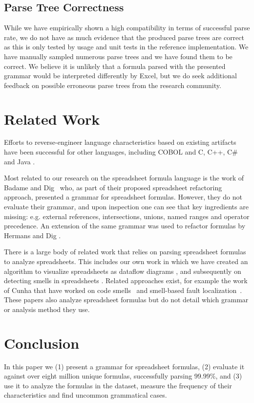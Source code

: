 \documentclass[times]{smrauth}
\begin{document}
\subsection{Parse Tree Correctness}

While we have empirically shown a high compatibility in terms of successful parse rate, we do not have as much evidence that the produced parse trees are correct as this is only tested by usage and unit tests in the reference implementation. We have manually sampled numerous parse trees and we have found them to be correct. We believe it is unlikely that a formula parsed with the presented grammar would be interpreted differently by Excel, but we do seek additional feedback on possible erroneous parse trees from the research community.

\section{Related Work}
\label{section:relatedWork}
Efforts to reverse-engineer language characteristics based on existing artifacts have been successful for other languages, including COBOL \cite{van1997obtaining} and C, C++, C\# and Java \cite{zaytsev2010recovery}.

Most related to our research on the spreadsheet formula language is the work of Badame and Dig~\cite{badame2012refactoring} who, as part of their proposed spreadsheet refactoring approach, presented a grammar for spreadsheet formulas. However, they do not evaluate their grammar, and upon inspection one can see that key ingredients are missing: e.g. external references, intersections, unions, named ranges and operator precedence. An extension of the same grammar was used to refactor formulas by Hermans and Dig \cite{hermans2014bumblebee}.

There is a large body of related work that relies on parsing spreadsheet formulas to analyze spreadsheets. This includes our own work in which we have created an algorithm to visualize spreadsheets as dataflow diagrams \cite{DBLP:conf/icse/HermansPD11}, and subsequently on detecting smells in spreadsheets \cite{DBLP:conf/icse/HermansPD12,DBLP:conf/icsm/Hermans212}. Related approaches exist, for example the work of Cunha that have worked on code smells~\cite{iccsa12} and smell-based fault localization~\cite{conf/icsme/CunhaFMPS14}. These papers also analyze spreadsheet formulas but do not detail which grammar or analysis method they use.

\section{Conclusion}
\label{section:conclusion}
In this paper we (1) present a grammar for spreadsheet formulas, (2) evaluate it against over eight million unique formulas, successfully parsing 99.99\%, and (3) use it to analyze the formulas in the dataset, measure the frequency of their characteristics and find uncommon grammatical cases.
\end{document}
